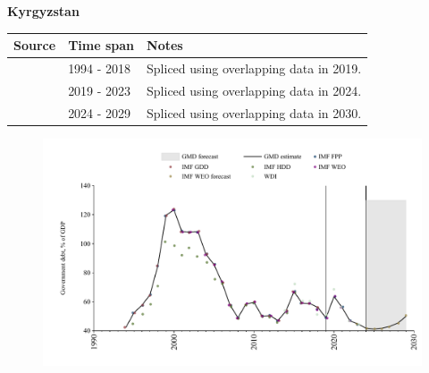 \documentclass[12pt,a4paper,landscape]{article}
\begin{document}
\begin{adjustbox}{max totalsize={\paperwidth}{\paperheight},center}
\begin{minipage}[t][\textheight][t]{\textwidth}
\vspace*{0.5cm}
{}
\begin{center}
{\Large\bfseries Kyrgyzstan}
\end{center}
\vspace{0.5cm}
\begin{table}[H]
\centering
\small
\begin{tabular}{|l|l|l|}
\hline
\textbf{Source} & \textbf{Time span} & \textbf{Notes} \\
\hline
\rowcolor{white}\cite{IMF_GDD}& 1994 - 2018 &Spliced using overlapping data in 2019.\\
\rowcolor{lightgray}\cite{IMF_FPP}& 2019 - 2023 &Spliced using overlapping data in 2024.\\
\rowcolor{white}\cite{IMF_WEO_forecast}& 2024 - 2029 &Spliced using overlapping data in 2030.\\
\hline
\end{tabular}
\end{table}
\begin{figure}[H]
\centering
\includegraphics[width=\textwidth,height=0.6\textheight,keepaspectratio]{graphs/KGZ_govdebt_GDP.pdf}
\end{figure}
\end{minipage}
\end{adjustbox}
\end{document}

